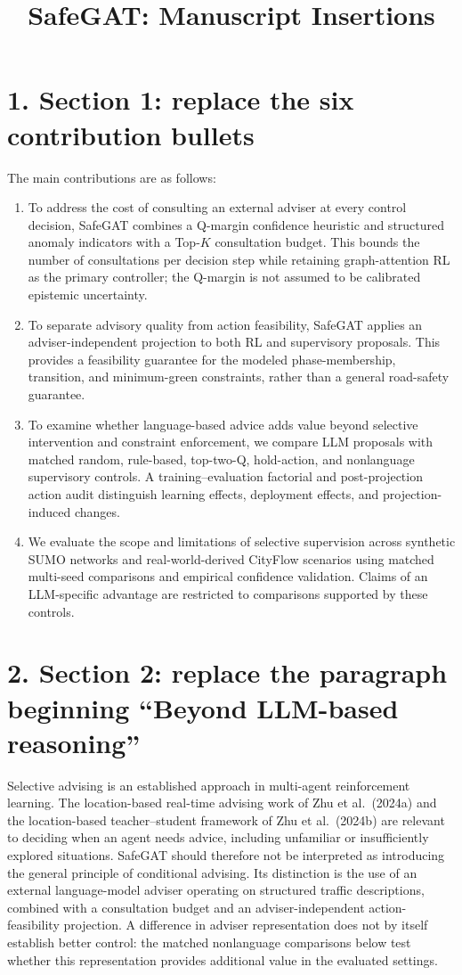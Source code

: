 \documentclass[10pt]{article}
\title{SafeGAT: Manuscript Insertions}
\author{}
\date{}
\begin{document}
\maketitle

\section*{1. Section 1: replace the six contribution bullets}
The main contributions are as follows:
\begin{enumerate}
\item To address the cost of consulting an external adviser at every control
decision, SafeGAT combines a Q-margin confidence heuristic and structured
anomaly indicators with a Top-$K$ consultation budget. This bounds the number
of consultations per decision step while retaining graph-attention RL as the
primary controller; the Q-margin is not assumed to be calibrated epistemic uncertainty.
\item To separate advisory quality from action feasibility, SafeGAT applies
an adviser-independent projection to both RL and supervisory proposals.
This provides a feasibility guarantee for the modeled phase-membership,
transition, and minimum-green constraints, rather than a general road-safety guarantee.
\item To examine whether language-based advice adds value beyond selective
intervention and constraint enforcement, we compare LLM proposals with matched
random, rule-based, top-two-Q, hold-action, and nonlanguage supervisory controls.
A training--evaluation factorial and post-projection action audit distinguish
learning effects, deployment effects, and projection-induced changes.
\item We evaluate the scope and limitations of selective supervision across
synthetic SUMO networks and real-world-derived CityFlow scenarios using matched
multi-seed comparisons and empirical confidence validation. Claims of an
LLM-specific advantage are restricted to comparisons supported by these controls.
\end{enumerate}

\section*{2. Section 2: replace the paragraph beginning ``Beyond LLM-based reasoning''}
Selective advising is an established approach in multi-agent reinforcement
learning. The location-based real-time advising work of Zhu et al.\ (2024a)
and the location-based teacher--student framework of Zhu et al.\ (2024b)
are relevant to deciding when an agent needs advice, including unfamiliar or
insufficiently explored situations. SafeGAT should therefore not be interpreted
as introducing the general principle of conditional advising. Its distinction
is the use of an external language-model adviser operating on structured traffic
descriptions, combined with a consultation budget and an adviser-independent
action-feasibility projection. A difference in adviser representation does not
by itself establish better control: the matched nonlanguage comparisons below
test whether this representation provides additional value in the evaluated settings.
\end{document}
